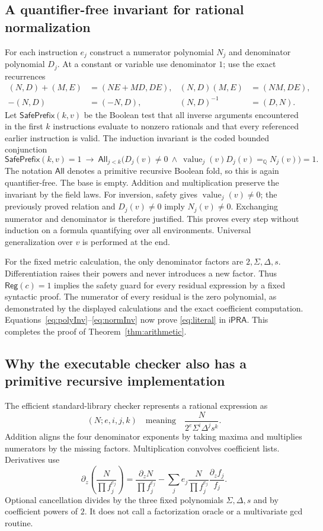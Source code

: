 \documentclass[11pt,a4paper]{article}
\numberwithin{equation}{section}
\theoremstyle{definition}\newtheorem{definition}[theorem]{Definition}
\theoremstyle{remark}\newtheorem{remark}[theorem]{Remark}
\newcommand{\ipra}{\mathsf{iPRA}}
\newcommand{\Q}{\mathbb{Q}}\newcommand{\Z}{\mathbb{Z}}\newcommand{\N}{\mathbb{N}}
\begin{document}
\subsection{A quantifier-free invariant for rational normalization}
For each instruction $e_j$ construct a numerator polynomial $N_j$ and denominator polynomial $D_j$. At a constant or variable use denominator $1$; use the exact recurrences
\begin{align*}
 (N,D)+(M,E)&=(NE+MD,DE),&
 (N,D)(M,E)&=(NM,DE),\\
 -(N,D)&=(-N,D),& (N,D)^{-1}&=(D,N).
\end{align*}
Let $\mathsf{SafePrefix}(k,v)$ be the Boolean test that all inverse arguments encountered in the first $k$ instructions evaluate to nonzero rationals and that every referenced earlier instruction is valid. The induction invariant is the coded bounded conjunction
\begin{equation}\label{eq:normInv}
 \mathsf{SafePrefix}(k,v)=1\ \longrightarrow\
 \mathsf{All}_{j<k}\bigl(D_j(v)\ne0\ \wedge\
       \operatorname{value}_j(v)D_j(v)=_\Q N_j(v)\bigr)=1.
\end{equation}
The notation $\mathsf{All}$ denotes a primitive recursive Boolean fold, so this is again quantifier-free. The base is empty. Addition and multiplication preserve the invariant by the field laws. For inversion, safety gives $\operatorname{value}_j(v)\ne0$; the previously proved relation and $D_j(v)\ne0$ imply $N_j(v)\ne0$. Exchanging numerator and denominator is therefore justified. This proves every step without induction on a formula quantifying over all environments. Universal generalization over $v$ is performed at the end.

For the fixed metric calculation, the only denominator factors are $2,\Sigma,\Delta,s$. Differentiation raises their powers and never introduces a new factor. Thus $\mathsf{Reg}(c)=1$ implies the safety guard for every residual expression by a fixed syntactic proof. The numerator of every residual is the zero polynomial, as demonstrated by the displayed calculations and the exact coefficient computation. Equations~\eqref{eq:polyInv}--\eqref{eq:normInv} now prove \eqref{eq:literal} in $\ipra$. This completes the proof of Theorem~\ref{thm:arithmetic}.

\subsection{Why the executable checker also has a primitive recursive implementation}
The efficient standard-library checker represents a rational expression as
\[
 (N;e,i,j,k)\quad\text{meaning}\quad
 \frac{N}{2^e\Sigma^i\Delta^j s^k}.
\]
Addition aligns the four denominator exponents by taking maxima and multiplies numerators by the missing factors. Multiplication convolves coefficient lists. Derivatives use
\[
 \partial_z\left(\frac N{\prod f_j^{e_j}}\right)
 =\frac{\partial_zN}{\prod f_j^{e_j}}
  -\sum_j e_j\frac N{\prod f_j^{e_j}}\frac{\partial_z f_j}{f_j}.
\]
Optional cancellation divides by the three fixed polynomials $\Sigma,\Delta,s$ and by coefficient powers of $2$. It does not call a factorization oracle or a multivariate gcd routine.
\end{document}
